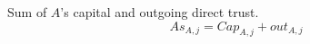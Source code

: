{}
\begin{definition}[Assets]
  Sum of $A$'s capital and outgoing direct trust.
  \begin{equation}
    As_{A, j} = Cap_{A, j} + out_{A, j}
  \end{equation}
\end{definition}
